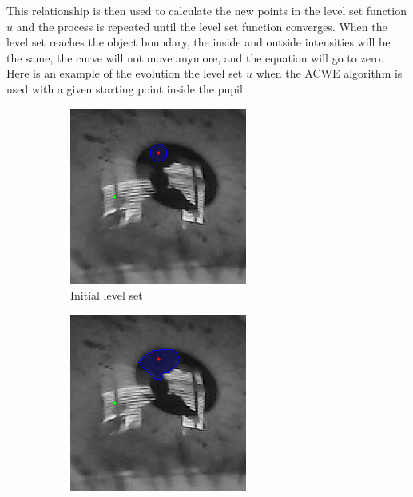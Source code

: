 This relationship is then used to calculate the new points in the level set function $u$ and the process is repeated until the level set function converges. When the level set reaches the object boundary, the inside and outside intensities will be the same, the curve will not move anymore, and the equation will go to zero. 
Here is an example of the evolution the level set $u$ when the ACWE algorithm is used with a given starting point inside the pupil. 
\begin{figure}[h]
    \centering
    \begin{subfigure}{0.3\textwidth}
        \centering
        \includegraphics[width=0.9\linewidth]{plots/acwe/iteration_0.png}
        \caption{Initial level set}
    \end{subfigure}%
    \hfill
    \begin{subfigure}{0.3\textwidth}
        \centering
        \includegraphics[width=0.9\linewidth]{plots/acwe/iteration_15.png}

\end{subfigure}
\end{figure}
